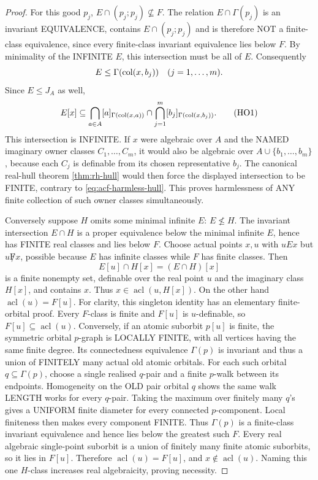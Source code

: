 \begin{proof}
For this good \(p_j\),
\(E\cap(p_j;p_j)\nsubseteq F\).
The relation \(E\cap\Gamma(p_j)\)
is an invariant EQUIVALENCE,
contains \(E\cap(p_j;p_j)\)
and is therefore NOT a
finite-class equivalence, since
every finite-class invariant
equivalence lies below \(F\).
By minimality of the INFINITE
\(E\), this intersection must
be all of \(E\). Consequently
\[
       E\le\Gamma(\operatorname{col}(x,b_j))
                    \quad(j=1,\ldots,m).
\]
Since \(E\le J_A\) as well,
\[
 E[x]\subseteq
  \bigcap_{a\in A}[a]_{\Gamma(\operatorname{col}(x,a))}
  \cap
  \bigcap_{j=1}^m[b_j]_{\Gamma(\operatorname{col}(x,b_j))}.
\tag{HO1}\label{eq:acf-harmless-hull}
\]
This intersection is INFINITE.
If \(x\) were algebraic over
\(A\) and the NAMED imaginary
owner classes \(C_1,\ldots,C_m\),
it would also be algebraic over
\(A\cup\{b_1,\ldots,b_m\}\),
because each \(C_j\) is definable
from its chosen representative
\(b_j\). The canonical real-hull
theorem \cref{thm:rh-hull}
would then force the displayed
intersection to be FINITE,
contrary to \eqref{eq:acf-harmless-hull}.
This proves harmlessness of
ANY finite collection of such
owner classes simultaneously.

Conversely suppose \(H\) omits
some minimal infinite \(E\):
\(E\nleq H\). The invariant
intersection \(E\cap H\)
is a proper equivalence below
the minimal infinite \(E\),
hence has FINITE real classes
and lies below \(F\).
Choose actual points \(x,u\)
with \(uEx\) but \(u\not F x\),
possible because \(E\) has
infinite classes while \(F\)
has finite classes. Then
\[
       E[u]\cap H[x]
                =(E\cap H)[x]
\]
is a finite nonempty set,
definable over the real point
\(u\) and the imaginary class
\(H[x]\), and contains \(x\).
Thus \(x\in\operatorname{acl}
(u,H[x])\). On the other hand
\(\operatorname{acl}(u)=F[u]\).
For clarity, this singleton
identity has an elementary
finite-orbital proof. Every
\(F\)-class is finite and
\(F[u]\) is \(u\)-definable,
so \(F[u]\subseteq\operatorname{acl}(u)\).
Conversely, if an atomic
suborbit \(p[u]\) is finite,
the symmetric orbital
\(p\)-graph is LOCALLY FINITE,
with all vertices having
the same finite degree.
Its connectedness equivalence
\(\Gamma(p)\) is invariant
and thus a union of FINITELY
many actual old atomic
orbitals. For each such
orbital \(q\subseteq\Gamma(p)\),
choose a single realised
\(q\)-pair and a finite
\(p\)-walk between its
endpoints. Homogeneity on
the OLD pair orbital \(q\)
shows the same walk LENGTH
works for every \(q\)-pair.
Taking the maximum over
finitely many \(q\)'s gives
a UNIFORM finite diameter
for every connected
\(p\)-component. Local
finiteness then makes every
component FINITE. Thus
\(\Gamma(p)\) is a finite-class
invariant equivalence and
hence lies below the
greatest such \(F\).
Every real algebraic
single-point suborbit is
a union of finitely many
finite atomic suborbits,
so it lies in \(F[u]\).
Therefore
\(\operatorname{acl}(u)=F[u]\),
and \(x\notin\operatorname{acl}(u)\).
Naming this one \(H\)-class
increases real algebraicity,
proving necessity.
\end{proof}
